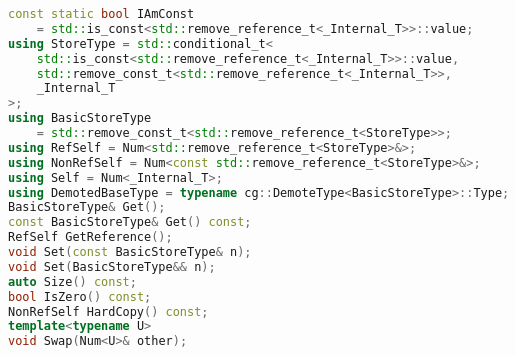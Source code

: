 \documentclass{article}
\begin{document}
\begin{lstlisting}[language=C++, label=code:9, caption=Special Members]
const static bool IAmConst 
	= std::is_const<std::remove_reference_t<_Internal_T>>::value;
using StoreType = std::conditional_t<
	std::is_const<std::remove_reference_t<_Internal_T>>::value,
	std::remove_const_t<std::remove_reference_t<_Internal_T>>,
	_Internal_T
>;
using BasicStoreType
	= std::remove_const_t<std::remove_reference_t<StoreType>>;
using RefSelf = Num<std::remove_reference_t<StoreType>&>;
using NonRefSelf = Num<const std::remove_reference_t<StoreType>&>;
using Self = Num<_Internal_T>;
using DemotedBaseType = typename cg::DemoteType<BasicStoreType>::Type;
BasicStoreType& Get();
const BasicStoreType& Get() const;
RefSelf GetReference();
void Set(const BasicStoreType& n);
void Set(BasicStoreType&& n);
auto Size() const;
bool IsZero() const;
NonRefSelf HardCopy() const;
template<typename U>
void Swap(Num<U>& other);
\end{lstlisting}
\end{document}
